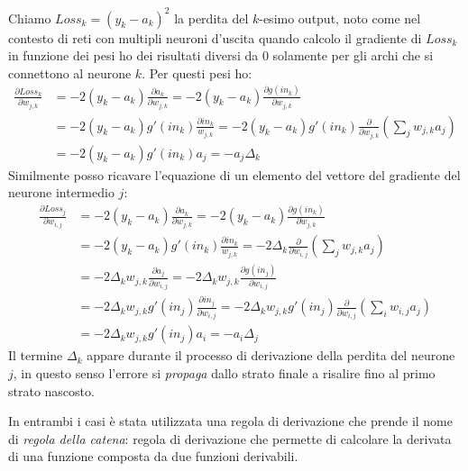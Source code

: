 \documentclass[../../main.tex]{subfiles}
\begin{document}
Chiamo $Loss_k = (y_k - a_k)^2$ la perdita del $k$-esimo output, noto come nel contesto di reti con multipli neuroni d'uscita quando calcolo il gradiente di $Loss_k$ in funzione dei pesi ho dei risultati diversi da 0 solamente per gli archi che si connettono al neurone $k$. Per questi pesi ho:
\begin{equation}
    \begin{aligned}
        \frac{\partial Loss_k}{\partial w_{j,k}} &= -2 (y_k - a_k) \frac{\partial a_k}{\partial w_{j,k}} = -2(y_k - a_k) \frac{\partial g(in_k)}{\partial w_{j,k}}\\
        & = -2(y_k - a_k)g'(in_k)\frac{\partial in_k}{w_{j,k}} = -2(y_k - a_k)g'(in_k) \frac{\partial}{\partial w_{j,k}}\left(\sum_j w_{j,k} a_j \right)\\
        & = -2(y_k - a_k)g'(in_k) a_j = -a_j \Delta_k        
    \end{aligned}
\end{equation}
Similmente posso ricavare l'equazione di un elemento del vettore del gradiente del neurone intermedio $j$:
\begin{equation}
    \begin{aligned}
        \frac{\partial Loss_j}{\partial w_{i,j}} &= -2 (y_k - a_k) \frac{\partial a_k}{\partial w_{j,k}} = -2(y_k - a_k) \frac{\partial g(in_k)}{\partial w_{j,k}}\\
        &= -2(y_k - a_k)g'(in_k)\frac{\partial in_k}{w_{j,k}} = -2 \Delta_k \frac{\partial}{\partial w_{i,j}}\left(\sum_j w_{j,k} a_j \right) \\
        &= -2 \Delta_k w_{j,k} \frac{\partial a_j}{\partial w_{i,j}} = -2 \Delta_k w_{j,k} \frac{\partial g(in_j)}{\partial w_{i,j}} \\
        &= -2 \Delta_k w_{j,k} g'(in_j) \frac{\partial in_j}{\partial w_{i,j}} = -2 \Delta_k w_{j,k} g'(in_j) \frac{\partial}{\partial w_{i,j}} \left(\sum_{i} w_{i,j} a_j\right)\\
        &= -2 \Delta_k w_{j,k} g'(in_j) a_i = -a_i \Delta_j
    \end{aligned}
\end{equation}
Il termine $\Delta_k$ appare durante il processo di derivazione della perdita  del neurone $j$, in questo senso l'errore si \textit{propaga} dallo strato finale a risalire fino al primo strato nascosto.

In entrambi i casi è stata utilizzata una regola di derivazione che prende il nome di \textit{regola della catena}: regola di derivazione che permette di calcolare la derivata di una funzione composta da due funzioni derivabili.
\end{document}
